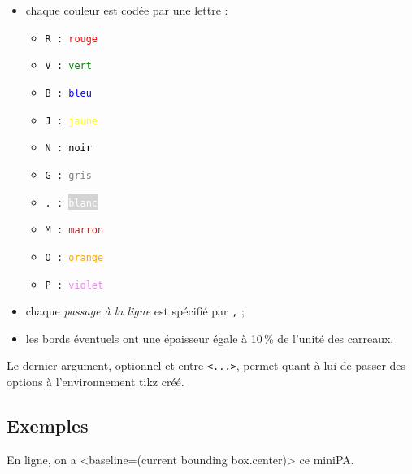 \documentclass{article}
\begin{document}
\begin{itemize}
	\item chaque couleur est codée par une lettre :
	\begin{multicols}{5}
		\begin{itemize}
			\item \texttt{R : \textcolor{red}{rouge}}
			\item \texttt{V : \textcolor{green}{vert}}
			\item \texttt{B : \textcolor{blue}{bleu}}
			\item \texttt{J : \textcolor{yellow}{jaune}}
			\item \texttt{N : \textcolor{black}{noir}}
			\item \texttt{G : \textcolor{gray}{gris}}
			\item \texttt{. : \colorbox{lightgray}{\textcolor{white}{blanc}}}
			\item \texttt{M : \textcolor{brown}{marron}}
			\item \texttt{O : \textcolor{orange}{orange}}
			\item \texttt{P : \textcolor{violet}{violet}}
		\end{itemize}
	\end{multicols}
	\item chaque \textit{passage à la ligne} est spécifié par \texttt{,} ;
	\item les bords éventuels ont une épaisseur égale à 10\,\% de l'unité des carreaux.
\end{itemize}

Le dernier argument, optionnel et entre \texttt{<...>}, permet quant à lui de passer des options à l'environnement \textsf{tikz} créé.

\subsection{Exemples}

\begin{PresentationCode}{}
\end{PresentationCode}

\begin{PresentationCode}{}
En ligne, on a <baseline=(current bounding box.center)> ce miniPA.
\end{PresentationCode}

\newpage
\end{document}
